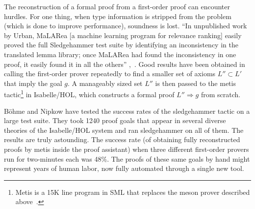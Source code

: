 \documentclass{llncs}
\begin{document}
The reconstruction of a
formal proof from a first-order proof can encounter hurdles.  For one thing, when type
information is stripped from the problem (which is done to improve
performance), soundness is lost.  ``In unpublished work by Urban,
MaLARea [a machine learning program for relevance ranking] easily
proved the full Sledgehammer test suite by identifying an
inconsistency in the translated lemma library; once MaLARea had found
the inconsistency in one proof, it easily found it in all the
others'' \cite{Paar},~\cite{UrM}. 
Good results have been obtained in calling the first-order prover repeatedly to find a smaller
set of axioms $L''\subset L'$ that imply the goal $g$. A manageably
sized set $L''$ is then passed to the metis tactic\footnote{Metis is a
  15K line program in SML that replaces the meson prover described
  above~\cite{Metis}.} in Isabelle/HOL, which constructs
a formal proof $L''\Longrightarrow g$ from scratch.



B\"ohme and Nipkow \cite{Boehme-Nipkow-IJCAR10} have tested the success rates of the
sledgehammer tactic on a large test suite.  They took 1240 proof goals
that appear in several diverse theories of the Isabelle/HOL system and
ran sledgehammer on all of them. The results are truly
astounding. The success rate (of obtaining fully reconstructed proofs
by metis inside the proof assistant) when three different first-order
provers run for two-minutes each was 48\%.  The proofs of these same
goals by hand might represent years of human labor, now fully
automated through a single new tool.
\end{document}
